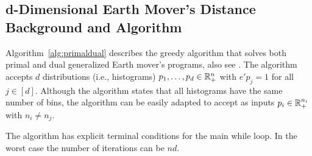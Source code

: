 \subsection{d-Dimensional Earth Mover's Distance Background and Algorithm}\label{sec:suppdemd}
Algorithm~\ref{alg:primaldual} describes the greedy algorithm that solves both primal and dual generalized Earth mover's programs, also see \citep{kline2019properties}. The algorithm accepts $d$ distributions (i.e., histograms) $p_1,\ldots,p_d\in\mathbb{R}^{n}_+$ with $e'p_j=1$ for all $j\in[d]$. 
Although the algorithm states that all histograms have the same number of bins, the algorithm can be 
easily adapted to accept as inputs $p_i\in\mathbb{R}^{n_i}_+$ with $n_i\not=n_j$.
\iffalse
\begin{algorithm}
\caption{EMD Primal/Dual Algorithm}\label{alg:primaldual}
\begin{algorithmic}
\State {\bf input} $p_j\in\RR^{n}_+$ with $e'p_j=1$ , $(\forall j\in[d])$
\State {\em //iteration index, active indices, primal variables, dual variables}
\State  $k \coloneqq 0\in\ZZ$, $I \coloneqq 0\in\ZZ^{d}$, $x \coloneqq 0\in\RR^{n^{d}}$, $z_j\coloneqq 0\in\RR^{n}$, $(\forall j\in [d])$
\While{$I(j) \leq n$, $(\forall j\in[d])$}
    \State $s_k\coloneqq \min_{j\in[d]} p_j(I(j))$ {\em\hspace*{\fill}  // the mass to move}
    \State $x(I)\gets s_k$  {\em \hspace*{\fill} // update the EMD solution}
    \State $p_j(I(j))\gets p_j(I(j))-s_k$, $(\forall j\in d)${\em\hspace*{\fill} // shrink the data}
    \State $j^*\gets\arg\min_{j\in[d]} p_j(I(j))$
    \State  $I(j^*)\gets I(j^*)+1$
    \State $k\gets k+1$
    \State $t_k\gets c(I)${\em\hspace*{\fill} // cost of this step}
    \If{ $I(j^*)\leq n$}
        \State  $z_{j^*}(I(j^*))\gets t_k-t_{k-1} + z_{j^*}(I(j^*)-1)$ {\em\hspace*{\fill} // update the dual solution}
    \EndIf
\EndWhile
\State \Return $x$, $(z_1,\ldots,z_d)$, and the objective value $\sum_k s_k t_k$.
\end{algorithmic}
\end{algorithm}
\fi
The algorithm has explicit terminal conditions for the main while loop. In the worst case the number of iterations can be $nd$.
